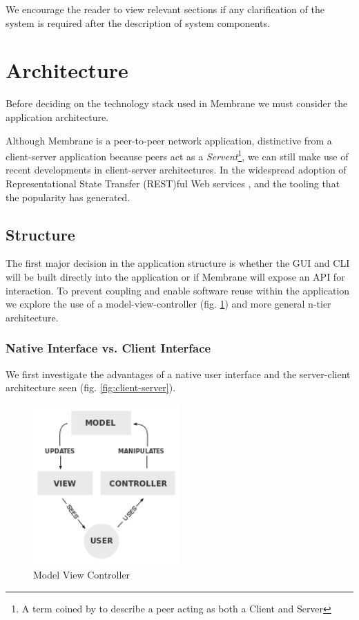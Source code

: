 \documentclass[11pt, a4paper, twoside]{report}
\begin{document}
We encourage the reader to view relevant sections if any clarification of the system is required after the description of system components.

\section{Architecture}

Before deciding on the technology stack used in Membrane we must consider the application architecture.

Although Membrane is a peer-to-peer network application, distinctive from a client-server application because peers act as a \emph{Servent}\footnote{A term coined by \cite{schollmeier2001definition} to describe a peer acting as both a Client and Server},  we can still make use of recent developments in client-server architectures. In the widespread adoption of Representational State Transfer (REST)ful Web services \citep{rodriguez2008restful}, and the tooling that the popularity has generated.

\subsection{Structure}

The first major decision in the application structure is whether the GUI and CLI will be built directly into the application or if Membrane will expose an API for interaction. To prevent coupling and enable software reuse within the application \citep{gamma1995design} we explore the use of a model-view-controller (fig. \ref{fig:model-view-controller}) and more general n-tier architecture.

\subsubsection{Native Interface vs. Client Interface}

We first investigate the advantages of a native user interface and the server-client architecture seen (fig. \ref{fig:client-server}).

\begin{figure}[b!]
 \centering
 \includegraphics[width=0.5\textwidth]{model-view-controller}
 \caption{Model View Controller}
 \label{fig:model-view-controller}
\end{figure}
\end{document}
